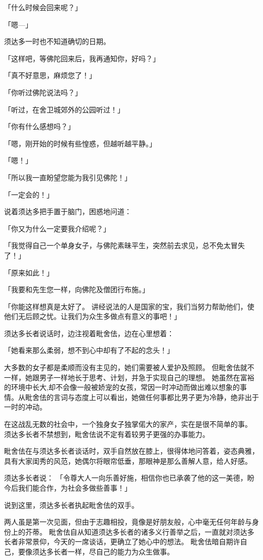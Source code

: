 \documentclass[twoside,openany]{book}
\begin{document}
「什么时候会回来呢？」

「嗯---」

须达多一时也不知道确切的日期。

「这样吧，等佛陀回来后，我再通知你，好吗？」

「真不好意思，麻烦您了！」

「你听过佛陀说法吗？」

「听过，在舍卫城郊外的公园听过！」

「你有什么感想吗？」

「嗯，刚开始的时候有些惶惑，但越听越平静。」

「嗯！」

「所以我一直盼望您能为我引见佛陀！」

「一定会的！」

说着须达多把手置于脑门，困惑地问道：

「你又为什么一定要我介绍呢？」

「我觉得自己一个单身女子，与佛陀素昧平生，突然前去求见，总不免太冒失了！」

「原来如此！」

「我要和先生您一样，向佛陀及僧团行布施。」

「你能这样想真是太好了。
讲经说法的人是国家的宝，我们当努力帮助他们，使他们无后顾之忧。让我们为众生多做点有意义的事吧！」

须达多长者说话时，边注视着毗舍佉，边在心里想着：

「她看来那么柔弱，想不到心中却有了不起的念头！」

大多数的女子都是柔顺而没有主见的，她们需要被人爱护及照顾。
但毗舍佉就不一样，她跟男子一样地长于思考、计划，并急于实现自己的理想。
她虽然在富裕的环境中长大,却不会像一般被娇宠的女孩，常因一时冲动而做出难以想象的事情。从毗舍佉的言词与态度上可以看出，她做任何事都比男子更为冷静，绝非出于一时的冲动。

在这战乱无数的社会中，一个独身女子独掌偌大的家产，实在是很不简单的事。
须达多长者不禁想到，毗舍佉说不定有着较男子更强的办事能力。

毗舍佉在与须达多长者谈话时，双手自然放在膝上，很得体地问答着，姿态典雅，具有大家闺秀的风范，她偶尔将眼帘低垂，那眼神是那么善解人意，给人好感。

须达多长者说：
「令尊大人一向乐善好施，相信你也已承袭了他的这一美德，盼今后我们能合作，为社会多做些善事！」

说到这里，须达多长者执起毗舍佉的双手。

两人虽是第一次见面，但由于志趣相投，竟像是好朋友般，心中毫无任何年龄与身份上的芥蒂。
毗舍佉自从知道须达多长者的诸多义行善举之后，一直就对须达多长者非常景仰，今天的一席谈话，更确立了她心中的想法。
毗舍佉暗自期许自己，要像须达多长者一样，尽自己的能力为众生做事。
\end{document}
